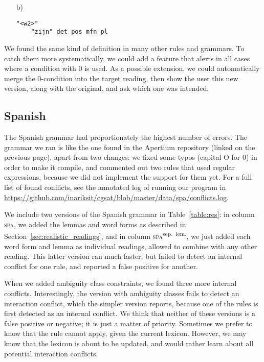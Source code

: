 {{\begin{itemize}
\item[b)] \begin{verbatim}
"<w2>"
    "zijn" det pos mfn pl
\end{verbatim}
\end{itemize}


We found the same kind of definition in many other rules and grammars.
To catch them more systematically, we could add a feature that alerts in all cases where a condition with 0 is used. As a possible extension, we could automatically merge the 0-condition into the target reading, then show the user this new version, along with the original, and ask which one was intended.


\subsection{Spanish} The Spanish grammar had proportionately the
highest number of errors. The grammar we ran is like the one
found in the Apertium repository (linked on the previous page), 
apart from two changes: we fixed some typos (capital O for 0) in order to make it compile, and
commented out two rules that used regular expressions, because we did not implement the support for them yet.
For a full list of found conflicts, see the annotated log of running our program in \url{
https://github.com/inariksit/cgsat/blob/master/data/spa/conflicts.log}. 


We include two versions of the Spanish grammar in Table~\ref{table:res}: in column \textsc{spa}, we added the lemmas and word forms as described in Section~\ref{sec:realistic_readings}, and in column \textsc{spa}\textsuperscript{sep.~lem.}, we just added each word form and lemma as individual readings, allowed to combine with any other reading. 
This latter version ran much faster, but failed to detect an internal conflict for one rule, and reported a false positive for another. 

When we added ambiguity class constraints, we found three more internal conflicts.
Interestingly, the version with ambiguity classes fails to detect an interaction conflict, which the simpler version reports, because one of the rules is first detected as an internal conflict. 
We think that neither of these versions is a false positive or negative; it is just a matter of priority. Sometimes we prefer to know that the rule cannot apply, given the current lexicon. 
However, we may know that the lexicon is about to be updated, and would rather learn about all potential interaction conflicts.

}}
